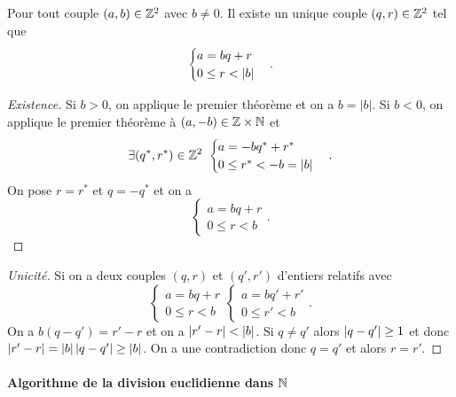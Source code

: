 \begin{theo}
  Pour tout couple $(a,b) \in \mathbb{Z}^2$ avec $b \neq 0$. Il existe un unique couple $(q,r) \in \mathbb{Z}^2$ tel que
  \begin{equation}
    \begin{cases}
      a=bq+r \\ 0 \leq r < \left\lvert b\right\rvert
    \end{cases}.
  \end{equation}
\end{theo}
\begin{proof}[Existence]
  Si $b>0$, on applique le premier théorème et on a $b=|b|$. Si $b<0$, on applique le premier théorème à $(a,-b) \in \mathbb{Z} \times \mathbb{N}$ et
  \begin{equation}
    \exists (q^*, r^*) \in \mathbb{Z}^2 \
    \begin{cases}
      a=-bq^* + r^* \\ 0 \leq r^* < -b=\left\lvert b\right\rvert
    \end{cases}.
  \end{equation}
On pose $r=r^*$ et $q=-q^*$ et on a
  \begin{equation}
    \begin{cases}
      a=bq+r \\ 0 \leq r < b
    \end{cases}.
  \end{equation}
\end{proof}
\begin{proof}[Unicité]
  Si on a deux couples $(q,r)$ et $(q',r')$ d'entiers relatifs avec
  \begin{equation}
    \begin{cases}
      a=bq + r \\ 0 \leq r < b
    \end{cases}
    \begin{cases}
      a=bq' + r' \\ 0 \leq r' < b
    \end{cases}.
  \end{equation}
  On a $b(q-q')=r'-r$ et on a $\left\lvert r'-r\right\rvert < \left\lvert b\right\rvert$. Si $q \neq q'$ alors $\left\lvert q-q'\right\rvert \geq 1$ et donc $\left\lvert r'-r\right\rvert=\left\lvert b\right\rvert\left\lvert q-q'\right\rvert \geq \left\lvert b\right\rvert$. On a une contradiction donc $q=q'$ et alors $r=r'$.
\end{proof}

\paragraph{Algorithme de la division euclidienne dans $\mathbb{N}$}

